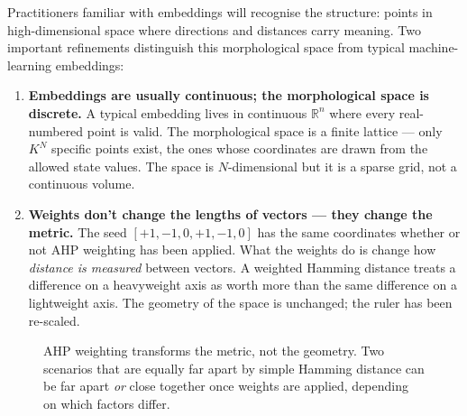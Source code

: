 \documentclass[11pt,a4paper]{article}
\begin{document}
Practitioners familiar with embeddings will recognise the structure: points in high-dimensional space where directions and distances carry meaning. Two important refinements distinguish this morphological space from typical machine-learning embeddings:

\begin{enumerate}[leftmargin=*]
  \item \textbf{Embeddings are usually continuous; the morphological space is discrete.} A typical embedding lives in continuous $\mathbb{R}^n$ where every real-numbered point is valid. The morphological space is a finite lattice — only $K^N$ specific points exist, the ones whose coordinates are drawn from the allowed state values. The space is $N$-dimensional but it is a sparse grid, not a continuous volume.
  \item \textbf{Weights don't change the lengths of vectors — they change the metric.} The seed $[+1, -1, 0, +1, -1, 0]$ has the same coordinates whether or not AHP weighting has been applied. What the weights do is change how \emph{distance is measured} between vectors. A weighted Hamming distance treats a difference on a heavyweight axis as worth more than the same difference on a lightweight axis. The geometry of the space is unchanged; the ruler has been re-scaled.
\end{enumerate}

\begin{figure}[H]
\centering
{}
\caption{AHP weighting transforms the metric, not the geometry. Two scenarios that are equally far apart by simple Hamming distance can be far apart \emph{or} close together once weights are applied, depending on which factors differ.}
\end{figure}
\end{document}
